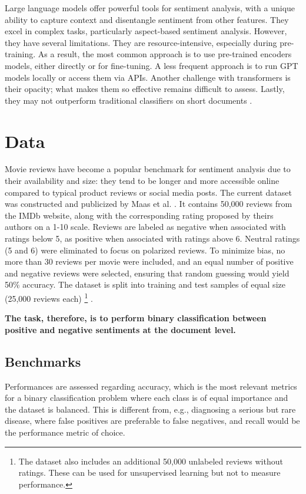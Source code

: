 \documentclass{article}
\begin{document}
Large language models offer powerful tools for sentiment analysis, with a unique ability to capture context and disentangle sentiment from other features. They excel in complex tasks, particularly aspect-based sentiment analysis. However, they have several limitations. They are resource-intensive, especially during pre-training. As a result, the most common approach is to use pre-trained encoders models, either directly or for fine-tuning. A less frequent approach is to run GPT models locally or access them via APIs. Another challenge with transformers is their opacity; what makes them so effective remains difficult to assess. Lastly, they may not outperform traditional classifiers on short documents \citep{ghatora_sentiment_2024}.


\section{Data}

Movie reviews have become a popular benchmark for sentiment analysis due to their availability and size: they tend to be longer and more accessible online compared to typical product reviews or social media posts. The current dataset was constructed and publicized by Maas et al. \citep{maas_learning_2011}. It contains 50,000 reviews from the IMDb website, along with the corresponding rating proposed by theirs authors on a 1-10 scale. Reviews are labeled as negative when associated with ratings below 5, as positive when associated with ratings above 6. Neutral ratings (5 and 6) were eliminated to focus on polarized reviews. To minimize bias, no more than 30 reviews per movie were included, and an equal number of positive and negative reviews were selected, ensuring that random guessing would yield 50\% accuracy. The dataset is split into training and test samples of equal size (25,000 reviews each) 
\footnote{The dataset also includes an additional 50,000 unlabeled reviews without ratings. These can be used for unsupervised learning but not to measure performance.}
.

\textbf{The task, therefore, is to perform binary classification between positive and negative sentiments at the document level.}

\subsection{Benchmarks}

Performances are assessed regarding accuracy, which is the most relevant metrics for a binary classification problem where each class is of equal importance and the dataset is balanced. This is different from, e.g., diagnosing a serious but rare disease, where false positives are preferable to false negatives, and recall would be the performance metric of choice.
\end{document}
